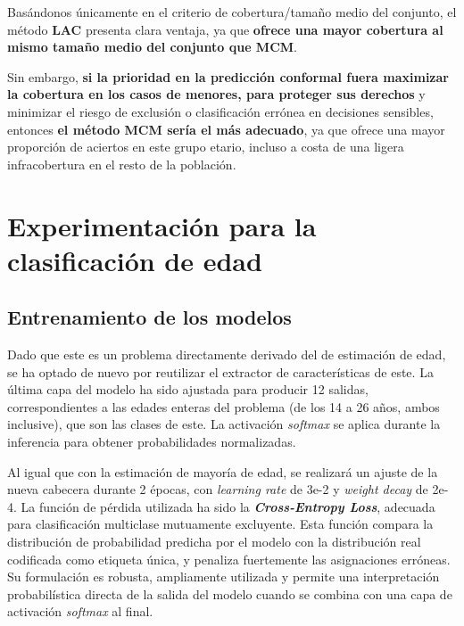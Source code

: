 Basándonos únicamente en el criterio de cobertura/tamaño medio del conjunto, el método \textbf{LAC} presenta clara ventaja, ya que \textbf{ofrece una mayor cobertura al mismo tamaño medio del conjunto que MCM}.

Sin embargo, \textbf{si la prioridad en la predicción conformal fuera maximizar la cobertura en los casos de menores, para proteger sus derechos} y minimizar el riesgo de exclusión o clasificación errónea en decisiones sensibles, entonces \textbf{el método MCM sería el más adecuado}, ya que ofrece una mayor proporción de aciertos en este grupo etario, incluso a costa de una ligera infracobertura en el resto de la población.


\FloatBarrier



\section{Experimentación para la clasificación de edad}


\subsection{Entrenamiento de los modelos}

Dado que este es un problema directamente derivado del de estimación de edad, se ha optado de nuevo por reutilizar el extractor de características de este. La última capa del modelo ha sido ajustada para producir 12 salidas, correspondientes a las edades enteras del problema (de los 14 a 26 años, ambos inclusive), que son las clases de este. La activación \textit{softmax} se aplica durante la inferencia para obtener probabilidades normalizadas.

Al igual que con la estimación de mayoría de edad, se realizará un ajuste de la nueva cabecera durante 2 épocas, con \textit{learning rate} de 3e-2 y \textit{weight decay} de 2e-4. La función de pérdida utilizada ha sido la \textbf{\textit{Cross-Entropy Loss}}, adecuada para clasificación multiclase mutuamente excluyente. Esta función compara la distribución de probabilidad predicha por el modelo con la distribución real codificada como etiqueta única, y penaliza fuertemente las asignaciones erróneas. Su formulación es robusta, ampliamente utilizada y permite una interpretación probabilística directa de la salida del modelo cuando se combina con una capa de activación \textit{softmax} al final.

